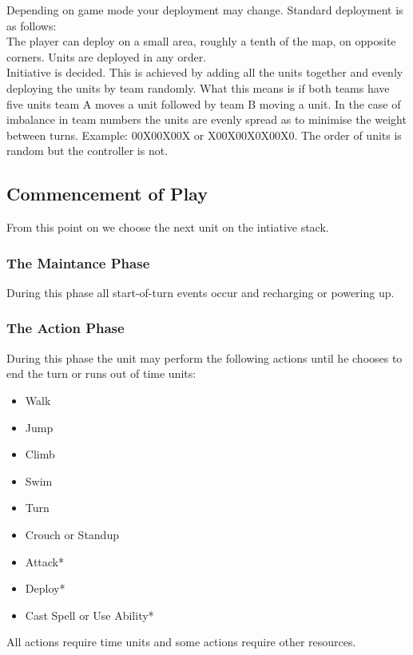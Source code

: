 \documentclass[a4paper]{article}
\begin{document}
Depending on game mode your deployment may change. Standard deployment is as follows:\\
 The player can deploy on a small area, roughly a tenth of the map, on opposite corners. Units are deployed in any order. \\
 Initiative is decided. This is achieved by adding all the units together and evenly deploying the units by team randomly. What this means is if both teams have five units team A moves a unit followed by team B moving a unit. In the case of imbalance in team numbers the units are evenly spread as to minimise the weight between turns. Example: 00X00X00X or X00X00X0X00X0. The order of units is random but the controller is not.

\subsection{Commencement of Play}

From this point on we choose the next unit on the intiative stack.

\subsubsection{The Maintance Phase}

During this phase all start-of-turn events occur and recharging or powering up.

\subsubsection{The Action Phase}

During this phase the unit may perform the following actions until he chooses to end the turn or runs out of time units:
\begin{itemize}
\item Walk
\item Jump
\item Climb
\item Swim
\item Turn
\item Crouch or Standup
\item Attack*
\item Deploy*
\item Cast Spell or Use Ability*
\end{itemize}

All actions require time units and some actions require other resources.
\end{document}
